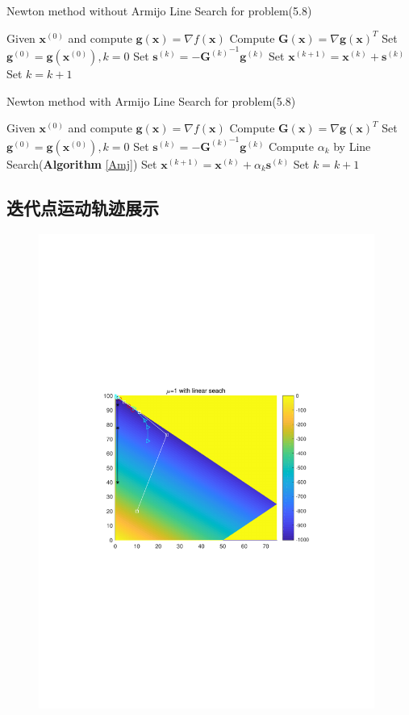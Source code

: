 \begin{algorithm}[h]  
\caption{Newton method without Armijo Line Search for problem(5.8)}  
\begin{algorithmic}[1]  
\STATE Given $\bm{x}^{(0)}$ and compute $\bm{g}(\bm{x})= \nabla f(\bm{x})$
\STATE Compute $\bm{G}(\bm{x})= \nabla {\bm{g}(\bm{x})}^T$
\STATE Set $\bm{g}^{(0)}=\bm{g}(\bm{x}^{(0)}),k=0$
\STATE Set $\bm{s}^{(k)}=-{\bm{G}^{(k)}}^{-1}\bm{g}^{(k)}$
\STATE Set $\bm{x}^{(k+1)}=\bm{x}^{(k)}+\bm{s}^{(k)}$
\STATE Set $k=k+1$
\ENDWHILE
\end{algorithmic}  
\end{algorithm} 

\begin{algorithm}[h]  
\caption{Newton method with Armijo Line Search for problem(5.8)}  
\label{NewtonAmj} 
\begin{algorithmic}[1]  
\STATE Given $\bm{x}^{(0)}$ and compute $\bm{g}(\bm{x})= \nabla f(\bm{x})$
\STATE Compute $\bm{G}(\bm{x})= \nabla {\bm{g}(\bm{x})}^T$
\STATE Set $\bm{g}^{(0)}=\bm{g}(\bm{x}^{(0)}),k=0$
\STATE Set $\bm{s}^{(k)}=-{\bm{G}^{(k)}}^{-1}\bm{g}^{(k)}$
\STATE Compute $\alpha_k$ by Line Search(\textbf{Algorithm} \ref{Amj})
\STATE Set $\bm{x}^{(k+1)}=\bm{x}^{(k)}+\alpha_k\bm{s}^{(k)}$
\STATE Set $k=k+1$
\ENDWHILE
\end{algorithmic}  
\end{algorithm} 



\subsection{迭代点运动轨迹展示}
\begin{figure}[H]
\centering
\includegraphics[width=11cm]{fig/3_1.pdf}
\end{figure}

